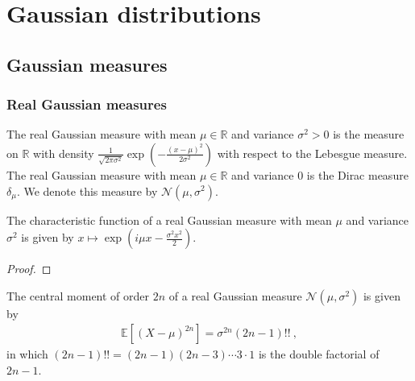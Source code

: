 \chapter{Gaussian distributions}
\label{chap:gaussian}

\section{Gaussian measures}
\label{sec:gaussian_measures}

\subsection{Real Gaussian measures}

\begin{definition}\label{def:gaussianReal}
  \mathlibok
  The real Gaussian measure with mean $\mu \in \mathbb{R}$ and variance $\sigma^2 > 0$ is the measure on $\mathbb{R}$ with density $\frac{1}{\sqrt{2 \pi \sigma^2}} \exp\left(-\frac{(x - \mu)^2}{2 \sigma^2}\right)$ with respect to the Lebesgue measure.
  The real Gaussian measure with mean $\mu \in \mathbb{R}$ and variance $0$ is the Dirac measure $\delta_\mu$.
  We denote this measure by $\mathcal{N}(\mu, \sigma^2)$.
\end{definition}


\begin{lemma}\label{lem:charFun_gaussianReal}
  \mathlibok
The characteristic function of a real Gaussian measure with mean $\mu$ and variance $\sigma^2$ is given by
$x \mapsto \exp\left(i \mu x - \frac{\sigma^2 x^2}{2}\right)$.
\end{lemma}

\begin{proof}
\end{proof}


\begin{lemma}\label{lem:centralMoment_two_mul_gaussianReal}
  \leanok
The central moment of order $2n$ of a real Gaussian measure $\mathcal{N}(\mu, \sigma^2)$ is given by
\begin{align*}
  \mathbb{E}[(X - \mu)^{2n}] = \sigma^{2n} (2n - 1)!! \: ,
\end{align*}
in which $(2n - 1)!! = (2n - 1)(2n - 3) \cdots 3 \cdot 1$ is the double factorial of $2n - 1$.
\end{lemma}

